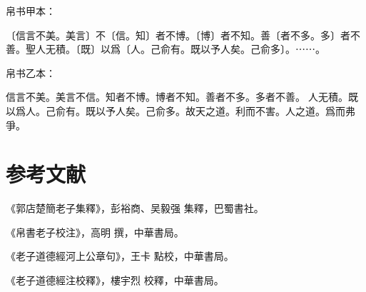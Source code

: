 \documentclass[a5paper]{ctexbook}
\begin{document}
    帛书甲本：

    〔信言不美。美言〕不〔信。知〕者不博。〔博〕者不知。善〔者不多。多〕者不善。聖人无積。〔既〕以爲〔人。己俞有。既以予人矣。己俞多〕。⋯⋯。

    帛书乙本：

    信言不美。美言不信。知者不博。博者不知。善者不多。多者不善。𦔻人无積。既以爲人。己俞有。既以予人矣。己俞多。故天之道。利而不害。人之道。爲而弗爭。

    \chapter*{参考文献}
    《郭店楚簡老子集釋》，彭裕商、吴毅强 集釋，巴蜀書社。

    《帛書老子校注》，高明 撰，中華書局。

    《老子道德經河上公章句》，王卡 點校，中華書局。

    《老子道德經注校釋》，樓宇烈 校釋，中華書局。
\end{document}
